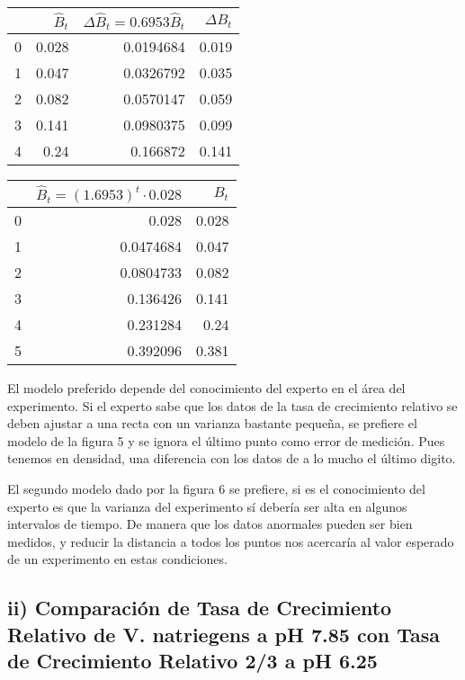 \documentclass[11pt]{article}
\begin{document}
    \begin{longtable}[]{@{}rrrr@{}}
\toprule
& \(\hat B_t\) & \(\Delta \hat B_t = 0.6953\hat B_t\) &
\(\Delta B_t\) \\
\midrule
\endhead
0 & 0.028 & 0.0194684 & 0.019 \\
1 & 0.047 & 0.0326792 & 0.035 \\
2 & 0.082 & 0.0570147 & 0.059 \\
3 & 0.141 & 0.0980375 & 0.099 \\
4 & 0.24 & 0.166872 & 0.141 \\
\bottomrule
\end{longtable}

\begin{longtable}[]{@{}rrr@{}}
\toprule
& \(\hat B_t = (1.6953)^t\cdot0.028\) & \(B_t\) \\
\midrule
\endhead
0 & 0.028 & 0.028 \\
1 & 0.0474684 & 0.047 \\
2 & 0.0804733 & 0.082 \\
3 & 0.136426 & 0.141 \\
4 & 0.231284 & 0.24 \\
5 & 0.392096 & 0.381 \\
\bottomrule
\end{longtable}

    El modelo preferido depende del conocimiento del experto en el área del
experimento. Si el experto sabe que los datos de la tasa de crecimiento
relativo se deben ajustar a una recta con un varianza bastante pequeña,
se prefiere el modelo de la figura 5 y se ignora el último punto como
error de medición. Pues tenemos en densidad, una diferencia con los
datos de a lo mucho el último digito.

El segundo modelo dado por la figura 6 se prefiere, si es el
conocimiento del experto es que la varianza del experimento sí debería
ser alta en algunos intervalos de tiempo. De manera que los datos
anormales pueden ser bien medidos, y reducir la distancia a todos los
puntos nos acercaría al valor esperado de un experimento en estas
condiciones.

    \hypertarget{ii-comparaciuxf3n-de-tasa-de-crecimiento-relativo-de-v.-natriegens-a-ph-7.85-con-tasa-de-crecimiento-relativo-23-a-ph-6.25}{%
\subsection{ii) Comparación de Tasa de Crecimiento Relativo de V.
natriegens a pH 7.85 con Tasa de Crecimiento Relativo 2/3 a pH
6.25}\label{ii-comparaciuxf3n-de-tasa-de-crecimiento-relativo-de-v.-natriegens-a-ph-7.85-con-tasa-de-crecimiento-relativo-23-a-ph-6.25}}
\end{document}
